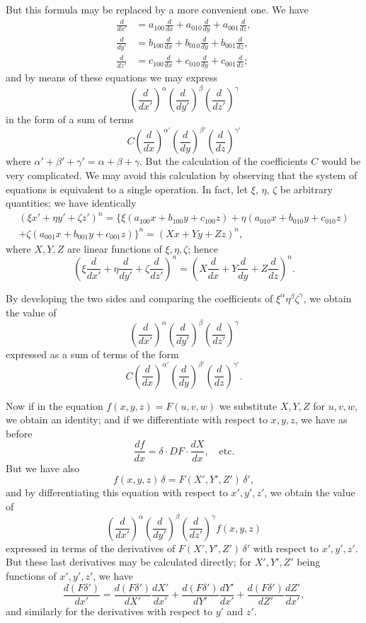 \documentclass[11pt,a4paper]{book}
\begin{document}
But this formula may be replaced by a more convenient one. We have
\begin{align*}
\frac{d}{dx'} &= a_{100}\frac{d}{dx} + a_{010}\frac{d}{dy} + a_{001}\frac{d}{dz}, \\
\frac{d}{dy'} &= b_{100}\frac{d}{dx} + b_{010}\frac{d}{dy} + b_{001}\frac{d}{dz}, \\
\frac{d}{dz'} &= c_{100}\frac{d}{dx} + c_{010}\frac{d}{dy} + c_{001}\frac{d}{dz};
\end{align*}
and by means of these equations we may express
\[
\left(\frac{d}{dx'}\right)^\alpha
\left(\frac{d}{dy'}\right)^\beta
\left(\frac{d}{dz'}\right)^\gamma
\]
in the form of a sum of terms
\[
C \left(\frac{d}{dx}\right)^{\alpha'} \left(\frac{d}{dy}\right)^{\beta'} \left(\frac{d}{dz}\right)^{\gamma'}
\]
where $\alpha'+\beta'+\gamma' = \alpha+\beta+\gamma$. But the calculation of the coefficients $C$ would be very complicated. We may avoid this calculation by observing that the system of equations is equivalent to a single operation. In fact, let $\xi$, $\eta$, $\zeta$ be arbitrary quantities; we have identically
\begin{multline*}
(\xi x' + \eta y' + \zeta z')^n
= \{ \xi(a_{100}x + b_{100}y + c_{100}z)
+ \eta(a_{010}x + b_{010}y + c_{010}z) \\
+ \zeta(a_{001}x + b_{001}y + c_{001}z) \}^n
= (Xx + Yy + Zz)^n,
\end{multline*}
where $X,Y,Z$ are linear functions of $\xi,\eta,\zeta$; hence
\[
\left(\xi\frac{d}{dx'} + \eta\frac{d}{dy'} + \zeta\frac{d}{dz'}\right)^n
= \left(X\frac{d}{dx} + Y\frac{d}{dy} + Z\frac{d}{dz}\right)^n.
\]

\setcounter{page}{57}

By developing the two sides and comparing the coefficients of $\xi^\alpha\eta^\beta\zeta^\gamma$, we obtain the value of
\[
\left(\frac{d}{dx'}\right)^\alpha
\left(\frac{d}{dy'}\right)^\beta
\left(\frac{d}{dz'}\right)^\gamma
\]
expressed as a sum of terms of the form
\[
C \left(\frac{d}{dx}\right)^{\alpha'} \left(\frac{d}{dy}\right)^{\beta'} \left(\frac{d}{dz}\right)^{\gamma'}.
\]

Now if in the equation $f(x,y,z)=F(u,v,w)$ we substitute $X,Y,Z$ for $u,v,w$, we obtain an identity; and if we differentiate with respect to $x,y,z$, we have as before
\[
\frac{df}{dx} = \delta \cdot DF \cdot \frac{dX}{dx}, \quad \text{etc.}
\]
But we have also
\[
f(x,y,z)\,\delta = F(X',Y',Z')\,\delta',
\]
and by differentiating this equation with respect to $x',y',z'$, we obtain the value of
\[
\left(\frac{d}{dx'}\right)^\alpha
\left(\frac{d}{dy'}\right)^\beta
\left(\frac{d}{dz'}\right)^\gamma f(x,y,z)
\]
expressed in terms of the derivatives of $F(X',Y',Z')\,\delta'$ with respect to $x',y',z'$. But these last derivatives may be calculated directly; for $X',Y',Z'$ being functions of $x',y',z'$, we have
\[
\frac{d(F\delta')}{dx'} = \frac{d(F\delta')}{dX'}\frac{dX'}{dx'} + \frac{d(F\delta')}{dY'}\frac{dY'}{dx'} + \frac{d(F\delta')}{dZ'}\frac{dZ'}{dx'},
\]
and similarly for the derivatives with respect to $y'$ and $z'$.
\end{document}
